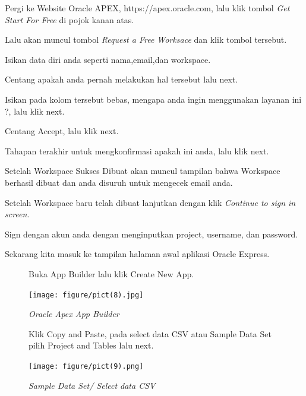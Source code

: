 \begin{enumerate}
\item Pergi ke Website Oracle APEX, https://apex.oracle.com, lalu klik tombol \textit{Get Start For Free} di pojok kanan atas.
    
\item Lalu akan muncul tombol \textit{Request a Free Worksace} dan klik tombol tersebut.

\item Isikan data diri anda seperti nama,email,dan workspace.
        
\item Centang apakah anda pernah melakukan hal tersebut lalu next.
      
\item Isikan pada kolom tersebut bebas, mengapa anda ingin menggunakan layanan ini ?, lalu klik next.
 
\item Centang Accept, lalu klik next.

\item Tahapan terakhir untuk mengkonfirmasi apakah ini anda, lalu klik next.

\item Setelah Workspace Sukses Dibuat akan muncul tampilan bahwa Workspace berhasil dibuat dan anda disuruh untuk mengecek email anda.

\item Setelah Workspace baru telah dibuat lanjutkan dengan klik \textit{Continue to sign in screen}.

\item Sign dengan akun anda dengan menginputkan project, username, dan password.


\item Sekarang kita masuk ke tampilan halaman awal aplikasi Oracle Express.

\begin{figure}
\item Buka App Builder lalu klik Create New App.

\texttt{[image: figure/pict(8).jpg]}
    \caption{\textit{Oracle Apex App Builder}}
\label{gambar}
\end{figure}

\begin{figure}
\item Klik Copy and Paste, pada select data CSV atau Sample Data Set pilih Project and Tables lalu next.

    \begin{center}
\texttt{[image: figure/pict(9).png]}
    \caption{\textit{Sample Data Set/ Select data CSV}}
        \end{center}
\label{gambar}
\end{figure}


\end{enumerate}

